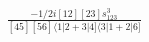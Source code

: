 \documentclass[varwidth, border=5pt]{standalone}
\begin{document}
\begin{my}
$\begin{gathered}
\scriptscriptstyle\frac{-1/2i[12][23]s_{123}^3}{[45][56]\langle1|2+3|4]\langle3|1+2|6]}
\end{gathered}$
\end{my}
\end{document}
